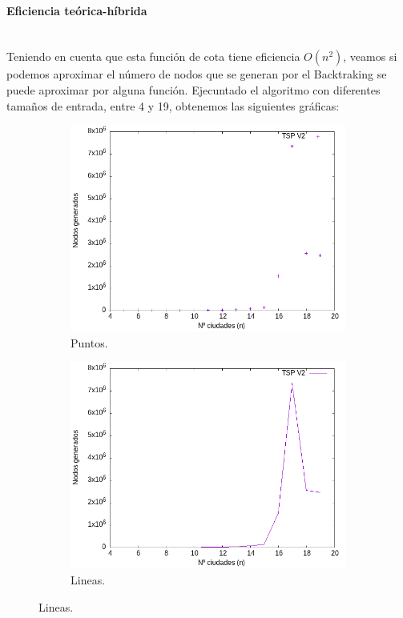 \documentclass{article}
\newcommand{\myparagraph}[1]{\paragraph{#1}\mbox{}\\}
\begin{document}
\myparagraph{Eficiencia teórica-híbrida}
Teniendo en cuenta que esta función de cota tiene eficiencia $O(n^2)$, 
veamos si podemos aproximar el número de nodos que se generan por el Backtraking se puede aproximar por alguna función. Ejecuntado el algoritmo con diferentes tamaños de entrada, entre 4 y 19, obtenemos las siguientes gráficas:


\begin{figure}[H]
    \centering
    \begin{subfigure}[b]{0.45\textwidth}
        \centering
        \includegraphics[width=\textwidth]{Sucio_Olga/Data/salidaSoloPuntos.png}
        \caption{Puntos.}
    \end{subfigure}
    \begin{subfigure}[b]{0.45\textwidth}
        \centering
        \includegraphics[width=\textwidth]{Sucio_Olga/Data/salidaSoloLineas.png}
        \caption{Lineas.}
    \end{subfigure}
\end{figure}
\end{document}
